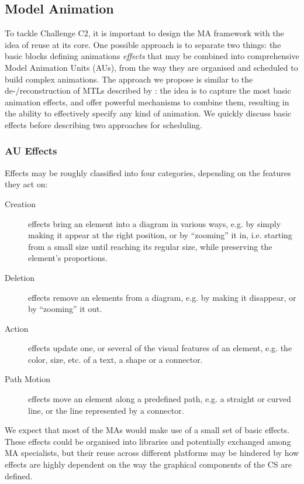 \subsection{Model Animation}
\label{sec:MA}

To tackle Challenge C2, it is important to design the MA framework with
the idea of reuse at its core. One possible approach is to separate two
things: the basic blocks defining animations \emph{effects} that may be combined
into comprehensive Model Animation Units (AUs), from the way they are organised
and scheduled to build complex animations. The approach we propose is similar
to the de-/reconstruction of MTLs described by \citet{J:SyrianiVangheluwe:2013}:
the idea is to capture the most basic animation effects, and offer powerful 
mechanisms to combine them, resulting in the ability to effectively specify any
kind of animation. We quickly discuss basic effects before describing two
approaches for scheduling.



\subsubsection{AU Effects}
\label{sec:MA-Effects}

Effects may be roughly classified into four categories, depending on the features
they act on:
\begin{description}
   \item[Creation] effects bring an element into a diagram in various ways, e.g. by
   simply making it appear at the right position, or by ``zooming'' it in, i.e.
   starting from a small size until reaching its regular size, while preserving 
   the element's proportions.
   
   \item[Deletion] effects remove an elements from a diagram, e.g. by making it
   disappear, or by ``zooming'' it out. 
   
   \item[Action] effects update one, or several of the visual features of an
   element, e.g. the color, size, etc. of a text, a shape or a connector.
   
   \item[Path Motion] effects move an element along a predefined path, e.g. a
   straight or curved line, or the line represented by a connector.
\end{description}
We expect that most of the MAs would make use of a small set of basic effects. 
These effects could be organised into libraries and potentially exchanged among
MA specialists, but their reuse across different platforms may be hindered by how
effects are highly dependent on the way the graphical components of the CS are
defined.

